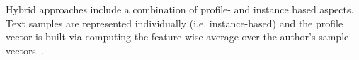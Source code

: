 Hybrid approaches include a combination of profile- and instance based aspects.
Text samples are represented individually (i.e. instance-based) and 
the profile vector is built via computing the feature-wise average over the author's sample vectors~\citep{stamatatos_survey_2009}.
